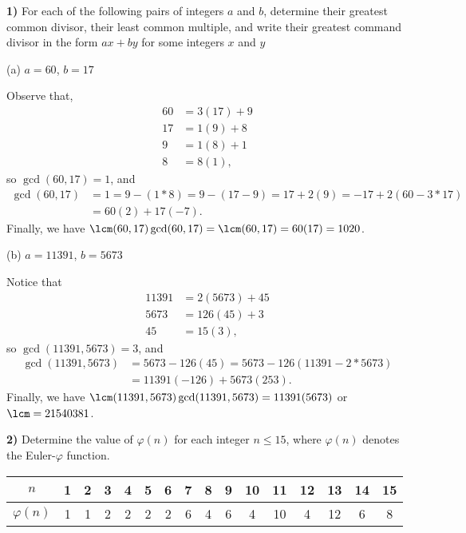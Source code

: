 \documentclass[12pt,a4paper]{article}
\newcommand{\prob}[2]{\textbf{#1)} #2}
\begin{document}
\prob{1}{For each of the following pairs of integers $a$ and $b$, determine their greatest common divisor, their least common multiple, and write their greatest command divisor in the form $ax + by$ for some integers $x$ and $y$}

(a) $a = 60$, $b = 17$

Observe that,
\begin{align*}
60 &= 3(17) + 9 \\
17 &= 1(9) + 8 \\
9 &= 1(8) + 1 \\
8 &= 8(1),
\end{align*}
so $\gcd(60,17) = 1$, and 
\begin{align*}
\gcd(60,17) &= 1 = 9 - (1*8) = 9 - (17 - 9) = 17 + 2(9) = -17 + 2(60 - 3*17) \\
&= 60(2) + 17(-7).
\end{align*}
Finally, we have $\lcm(60,17)\gcd(60,17) = \lcm(60,17) = 60(17) = 1020$. 

(b) $a = 11391$, $b = 5673$

Notice that
\begin{align*}
11391 &= 2(5673) + 45 \\
5673 &= 126(45) + 3 \\
45 &= 15(3),
\end{align*}
so $\gcd(11391,5673) = 3$, and
\begin{align*}
\gcd(11391,5673) &= 5673 - 126(45) = 5673 - 126(11391 - 2*5673) \\
&= 11391(-126) + 5673(253).
\end{align*}
Finally, we have $\lcm(11391,5673)\gcd(11391,5673) = 11391(5673)$ or $\lcm = 21540381$.

\prob{2}{Determine the value of $\varphi(n)$ for each integer $n \leq 15$, where $\varphi(n)$ denotes the Euler-$\varphi$ function.} \\

\begin{table}[h!]
\begin{center}
\begin{tabular}{|c|ccccccccccccccc|}
\hline
$n$ & 1 & 2 & 3 & 4 & 5 & 6 & 7 & 8 & 9 & 10 & 11 & 12 & 13 & 14 & 15 \\
\hline
$\varphi(n)$ & 1 & 1 & 2 & 2 & 2 & 2 & 6 & 4 & 6 & 4 & 10 & 4 & 12 & 6 & 8 \\
\hline
\end{tabular}
\end{center}
\end{table}
\end{document}
